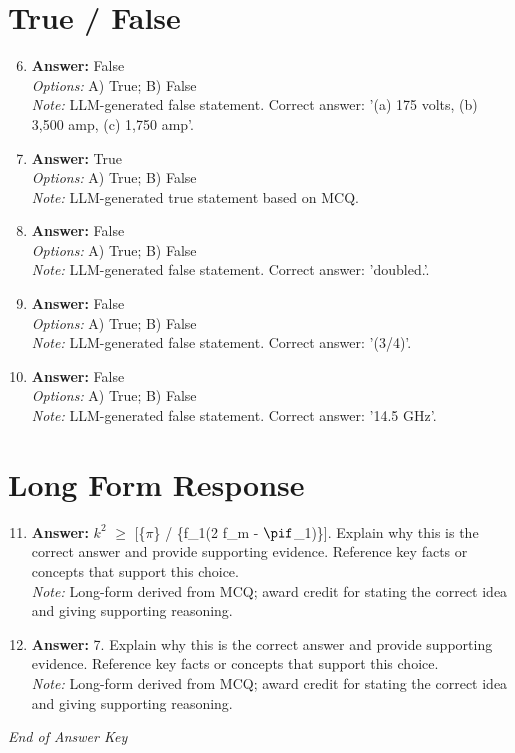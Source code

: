 \documentclass[12pt]{article}
\begin{document}
\section*{True / False}
\begin{enumerate}[label=\arabic*.]
\setcounter{enumi}{5}
\item \textbf{Answer:} False
\\ \textit{Options:} A) True; B) False
\\ \textit{Note:} LLM-generated false statement. Correct answer: '(a) 175 volts, (b) 3,500 amp, (c) 1,750 amp'.
\item \textbf{Answer:} True
\\ \textit{Options:} A) True; B) False
\\ \textit{Note:} LLM-generated true statement based on MCQ.
\item \textbf{Answer:} False
\\ \textit{Options:} A) True; B) False
\\ \textit{Note:} LLM-generated false statement. Correct answer: 'doubled.'.
\item \textbf{Answer:} False
\\ \textit{Options:} A) True; B) False
\\ \textit{Note:} LLM-generated false statement. Correct answer: '(3/4)'.
\item \textbf{Answer:} False
\\ \textit{Options:} A) True; B) False
\\ \textit{Note:} LLM-generated false statement. Correct answer: '14.5 GHz'.
\end{enumerate}

\section*{Long Form Response}
\begin{enumerate}[label=\arabic*.]
\setcounter{enumi}{10}
\item \textbf{Answer:} $k^2$ \ensuremath{\geq} [\{\ensuremath{\pi}\} / \{f\_1(2 f\_m - \ensuremath{\pif}\_1)\}]. Explain why this is the correct answer and provide supporting evidence. Reference key facts or concepts that support this choice.
\\ \textit{Note:} Long-form derived from MCQ; award credit for stating the correct idea and giving supporting reasoning.
\item \textbf{Answer:} 7. Explain why this is the correct answer and provide supporting evidence. Reference key facts or concepts that support this choice.
\\ \textit{Note:} Long-form derived from MCQ; award credit for stating the correct idea and giving supporting reasoning.
\end{enumerate}

\vfill
\noindent\textit{End of Answer Key}
\end{document}
